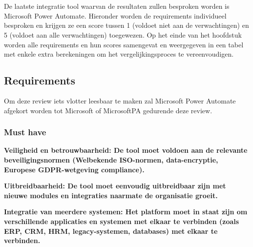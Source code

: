 \chapter{}
\label{ch:Microsoft}

De laatste integratie tool waarvan de resultaten zullen besproken worden is Microsoft Power Automate. Hieronder worden de requirements individueel besproken en krijgen ze een score tussen 1 (voldoet niet aan de verwachtingen) en 5 (voldoet aan alle verwachtingen) toegewezen. Op het einde van het hoofdstuk worden alle requirements en hun scores samengevat en weergegeven in een tabel met enkele extra berekeningen om het vergelijkingsproces te vereenvoudigen.

\section{Requirements}%
\label{RequirementsMicrosoft}

Om deze review iets vlotter leesbaar te maken zal Microsoft Power Automate afgekort worden tot Microsoft of MicrosoftPA gedurende deze review.

\subsection{Must have}%
\label{MustHaveMicrosoft}

\textbf{Veiligheid en betrouwbaarheid: De tool moet voldoen aan de relevante beveiligingsnormen (Welbekende ISO-normen, data-encryptie, Europese GDPR-wetgeving compliance).}

\vspace{\baselineskip}



\vspace{\baselineskip}

\textbf{Uitbreidbaarheid: De tool moet eenvoudig uitbreidbaar zijn met nieuwe modules en integraties naarmate de organisatie groeit.}

\vspace{\baselineskip}



\vspace{\baselineskip}

\textbf{Integratie van meerdere systemen: Het platform moet in staat zijn om verschillende applicaties en systemen met elkaar te verbinden (zoals ERP, CRM, HRM, legacy-systemen, databases) met elkaar te verbinden.}

